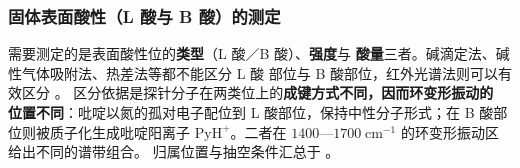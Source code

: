 \subsubsection{固体表面酸性（L 酸与 B 酸）的测定}

\begin{principle}
需要测定的是表面酸性位的\textbf{类型}（L 酸／B 酸）、\textbf{强度}与
\textbf{酸量}三者。碱滴定法、碱性气体吸附法、热差法等都不能区分 L 酸
部位与 B 酸部位，红外光谱法则可以有效区分
。
区分依据是探针分子在两类位上的\textbf{成键方式不同，因而环变形振动的
位置不同}：吡啶以氮的孤对电子配位到 L 酸部位，保持中性分子形式；在
B 酸部位则被质子化生成吡啶阳离子 $\mathrm{PyH^{+}}$。二者在
$1400$—$1700\;\mathrm{cm^{-1}}$ 的环变形振动区给出不同的谱带组合。
归属位置与抽空条件汇总于 。
\end{principle}

